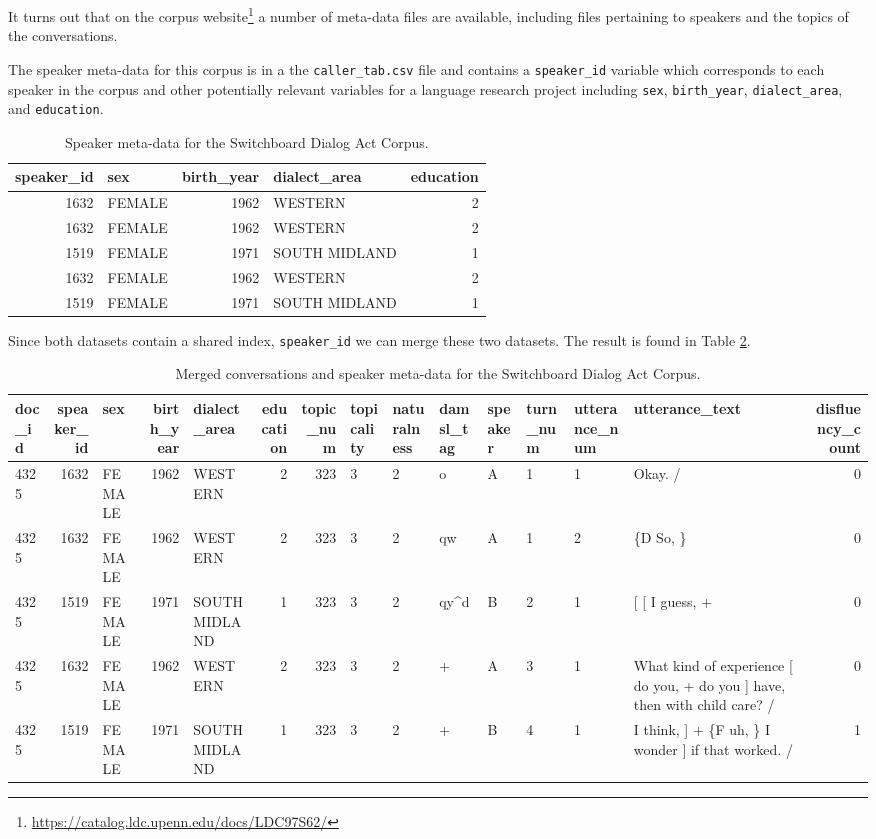 \documentclass[
]{article}
\DeclareRobustCommand{\href}[2]{#2\footnote{\url{#1}}}
\begin{document}
It turns out that on the \href{https://catalog.ldc.upenn.edu/docs/LDC97S62/}{corpus website} a number of meta-data files are available, including files pertaining to speakers and the topics of the conversations.

The speaker meta-data for this corpus is in a the \texttt{caller\_tab.csv} file and contains a \texttt{speaker\_id} variable which corresponds to each speaker in the corpus and other potentially relevant variables for a language research project including \texttt{sex}, \texttt{birth\_year}, \texttt{dialect\_area}, and \texttt{education}.

\begin{table}

\caption{\label{tab:merging-swda-speaker-table}Speaker meta-data for the Switchboard Dialog Act Corpus.}
\centering
\begin{tabular}[t]{rlrlr}
\toprule
speaker\_id & sex & birth\_year & dialect\_area & education\\
\midrule
1632 & FEMALE & 1962 & WESTERN & 2\\
1632 & FEMALE & 1962 & WESTERN & 2\\
1519 & FEMALE & 1971 & SOUTH MIDLAND & 1\\
1632 & FEMALE & 1962 & WESTERN & 2\\
1519 & FEMALE & 1971 & SOUTH MIDLAND & 1\\
\bottomrule
\end{tabular}
\end{table}

Since both datasets contain a shared index, \texttt{speaker\_id} we can merge these two datasets. The result is found in Table \ref{tab:merging-swda-speaker-added}.

\begin{table}

\caption{\label{tab:merging-swda-speaker-added}Merged conversations and speaker meta-data for the Switchboard Dialog Act Corpus.}
\centering
\begin{tabular}[t]{lrlrlrrlllllllr}
\toprule
doc\_id & speaker\_id & sex & birth\_year & dialect\_area & education & topic\_num & topicality & naturalness & damsl\_tag & speaker & turn\_num & utterance\_num & utterance\_text & disfluency\_count\\
\midrule
4325 & 1632 & FEMALE & 1962 & WESTERN & 2 & 323 & 3 & 2 & o & A & 1 & 1 & Okay.  / & 0\\
4325 & 1632 & FEMALE & 1962 & WESTERN & 2 & 323 & 3 & 2 & qw & A & 1 & 2 & \{D So, \} & 0\\
4325 & 1519 & FEMALE & 1971 & SOUTH MIDLAND & 1 & 323 & 3 & 2 & qy\textasciicircum{}d & B & 2 & 1 & {}[ [ I guess, + & 0\\
4325 & 1632 & FEMALE & 1962 & WESTERN & 2 & 323 & 3 & 2 & + & A & 3 & 1 & What kind of experience [ do you, + do you ] have, then with child care? / & 0\\
4325 & 1519 & FEMALE & 1971 & SOUTH MIDLAND & 1 & 323 & 3 & 2 & + & B & 4 & 1 & I think, ] + \{F uh, \} I wonder ] if that worked. / & 1\\
\bottomrule
\end{tabular}
\end{table}
\end{document}
